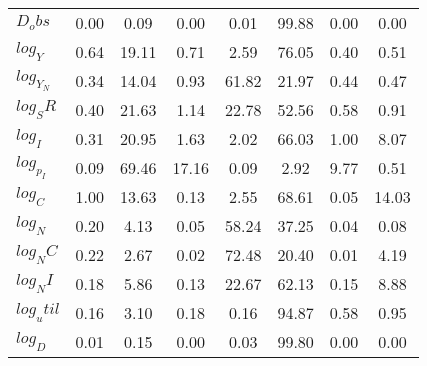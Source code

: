 \begin{center}
\begin{longtable}{lccccccc}
$D_obs     $	 & 	        0.00	 & 	        0.09	 & 	        0.00	 & 	        0.01	 & 	       99.88	 & 	        0.00	 & 	        0.00 \\ 
$log_Y     $	 & 	        0.64	 & 	       19.11	 & 	        0.71	 & 	        2.59	 & 	       76.05	 & 	        0.40	 & 	        0.51 \\ 
$log_Y_N   $	 & 	        0.34	 & 	       14.04	 & 	        0.93	 & 	       61.82	 & 	       21.97	 & 	        0.44	 & 	        0.47 \\ 
$log_SR    $	 & 	        0.40	 & 	       21.63	 & 	        1.14	 & 	       22.78	 & 	       52.56	 & 	        0.58	 & 	        0.91 \\ 
$log_I     $	 & 	        0.31	 & 	       20.95	 & 	        1.63	 & 	        2.02	 & 	       66.03	 & 	        1.00	 & 	        8.07 \\ 
$log_p_I   $	 & 	        0.09	 & 	       69.46	 & 	       17.16	 & 	        0.09	 & 	        2.92	 & 	        9.77	 & 	        0.51 \\ 
$log_C     $	 & 	        1.00	 & 	       13.63	 & 	        0.13	 & 	        2.55	 & 	       68.61	 & 	        0.05	 & 	       14.03 \\ 
$log_N     $	 & 	        0.20	 & 	        4.13	 & 	        0.05	 & 	       58.24	 & 	       37.25	 & 	        0.04	 & 	        0.08 \\ 
$log_NC    $	 & 	        0.22	 & 	        2.67	 & 	        0.02	 & 	       72.48	 & 	       20.40	 & 	        0.01	 & 	        4.19 \\ 
$log_NI    $	 & 	        0.18	 & 	        5.86	 & 	        0.13	 & 	       22.67	 & 	       62.13	 & 	        0.15	 & 	        8.88 \\ 
$log_util  $	 & 	        0.16	 & 	        3.10	 & 	        0.18	 & 	        0.16	 & 	       94.87	 & 	        0.58	 & 	        0.95 \\ 
$log_D     $	 & 	        0.01	 & 	        0.15	 & 	        0.00	 & 	        0.03	 & 	       99.80	 & 	        0.00	 & 	        0.00 \\ 
\end{longtable}
 \end{center}
